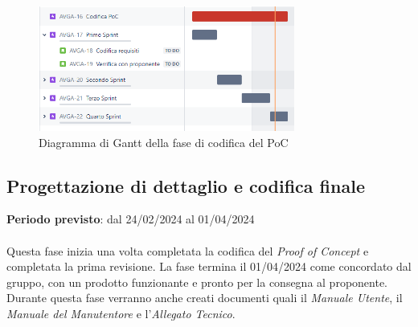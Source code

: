 \begin{figure}[H]
    \centering
    \includegraphics[width=0.75\textwidth]{images/gantt_codRTB.PNG}
    \caption{Diagramma di Gantt della fase di codifica del PoC}
    \label{fig:gantt_codRTB}
\end{figure}


\subsection{Progettazione di dettaglio e codifica finale}\label{sec:pianificazione:progCodifica}

\textbf{Periodo previsto}: dal 24/02/2024 al 01/04/2024\\\\
Questa fase inizia una volta completata la codifica del \textit{Proof of Concept} e completata la prima revisione. La fase termina il 01/04/2024 come concordato dal gruppo, con un prodotto funzionante e pronto per la consegna al proponente. Durante questa fase verranno anche creati documenti quali il \textit{Manuale Utente}, il \textit{Manuale del Manutentore} e l'\textit{Allegato Tecnico}.


